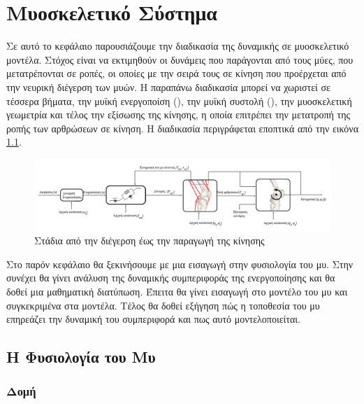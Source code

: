 \chapter{Μυοσκελετικό Σύστημα}

Σε αυτό το κεφάλαιο παρουσιάζουμε την διαδικασία της δυναμικής σε μυοσκελετικό μοντέλα. Στόχος είναι να εκτιμηθούν οι δυνάμεις που παράγονται από τους μύες, που μετατρέπονται σε  ροπές, οι οποίες με την σειρά τους σε κίνηση που προέρχεται από την νευρική διέγερση των μυών. Η παραπάνω διαδικασία μπορεί να χωριστεί σε τέσσερα βήματα, την μυϊκή ενεργοποίση (), την μυϊκή συστολή (), την μυοσκελετική γεωμετρία και τέλος την εξίσωσης της κίνησης, η οποία επιτρέπει την μετατροπή της ροπής των αρθρώσεων σε κίνηση. Η διαδικασία περιγράφεται εποπτικά από την εικόνα \ref{fig:muscle-excitation-force}.

\begin{figure}[H]
    \centering
    \includegraphics[width=1.0\textwidth]{musculoskeletal/fig/muscle-excitation-force.png}
    \caption{Στάδια από την διέγερση έως την παραγωγή της κίνησης\cite{erdemir07}}
    \label{fig:muscle-excitation-force}
\end{figure}

Στο παρόν κεφάλαιο θα ξεκινήσουμε με μια εισαγωγή στην φυσιολογία του μυ. Στην συνέχει θα γίνει ανάλυση της δυναμικής συμπεριφοράς της ενεργοποίησης και θα δοθεί μια μαθηματική διατύπωση. Έπειτα θα γίνει εισαγωγή στο μοντέλο του μυ και συγκεκριμένα στα  μοντέλα. Τέλος θα δοθεί εξήγηση πώς η τοποθεσία του μυ επηρεάζει την δυναμική του συμπεριφορά και πως αυτό μοντελοποιείται.

\section{H Φυσιολογία του Μυ}

\subsection{Δομή}

